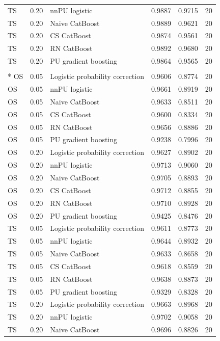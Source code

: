 \begin{longtable}{@{}p{0.65in}rp{2.85in}rrr@{}}
TS & 0.20 & nnPU logistic & 0.9887 & 0.9715 & 20 \\
TS & 0.20 & Naive CatBoost & 0.9889 & 0.9621 & 20 \\
TS & 0.20 & CS CatBoost & 0.9874 & 0.9561 & 20 \\
TS & 0.20 & RN CatBoost & 0.9892 & 0.9680 & 20 \\
TS & 0.20 & PU gradient boosting & 0.9864 & 0.9565 & 20 \\
\addlinespace[2pt]
\pagebreak
\multicolumn{6}{l}{\textbf{HTRU2}}\\*
OS & 0.05 & Logistic probability correction & 0.9606 & 0.8774 & 20 \\
OS & 0.05 & nnPU logistic & 0.9661 & 0.8919 & 20 \\
OS & 0.05 & Naive CatBoost & 0.9633 & 0.8511 & 20 \\
OS & 0.05 & CS CatBoost & 0.9600 & 0.8334 & 20 \\
OS & 0.05 & RN CatBoost & 0.9656 & 0.8886 & 20 \\
OS & 0.05 & PU gradient boosting & 0.9238 & 0.7996 & 20 \\
\addlinespace[2pt]
OS & 0.20 & Logistic probability correction & 0.9627 & 0.8902 & 20 \\
OS & 0.20 & nnPU logistic & 0.9713 & 0.9060 & 20 \\
OS & 0.20 & Naive CatBoost & 0.9705 & 0.8893 & 20 \\
OS & 0.20 & CS CatBoost & 0.9712 & 0.8855 & 20 \\
OS & 0.20 & RN CatBoost & 0.9710 & 0.8928 & 20 \\
OS & 0.20 & PU gradient boosting & 0.9425 & 0.8476 & 20 \\
\addlinespace[2pt]
TS & 0.05 & Logistic probability correction & 0.9611 & 0.8773 & 20 \\
TS & 0.05 & nnPU logistic & 0.9644 & 0.8932 & 20 \\
TS & 0.05 & Naive CatBoost & 0.9633 & 0.8658 & 20 \\
TS & 0.05 & CS CatBoost & 0.9618 & 0.8559 & 20 \\
TS & 0.05 & RN CatBoost & 0.9638 & 0.8873 & 20 \\
TS & 0.05 & PU gradient boosting & 0.9329 & 0.8328 & 20 \\
\addlinespace[2pt]
TS & 0.20 & Logistic probability correction & 0.9663 & 0.8968 & 20 \\
TS & 0.20 & nnPU logistic & 0.9702 & 0.9058 & 20 \\
TS & 0.20 & Naive CatBoost & 0.9696 & 0.8826 & 20 \\

\end{longtable}
